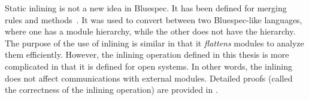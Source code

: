 Static inlining is not a new idea in Bluespec. It has been defined for
merging rules and methods~\cite{daniel-thesis}. It was used to convert
between two Bluespec-like languages, where one has a module hierarchy,
while the other does not have the hierarchy. The purpose of the use of
inlining is similar in that it \emph{flattens} modules to analyze them
efficiently. However, the inlining operation defined in this thesis is
more complicated in that it is defined for open systems. In other
words, the inlining does not affect communications with external
modules. Detailed proofs (called the correctness of the inlining
operation) are provided in .


